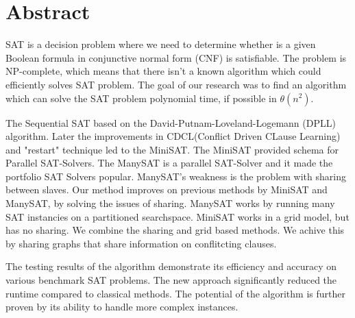 \documentclass{article}
\begin{document}
\section{Abstract}
SAT is a decision problem where we need to determine whether is a given Boolean formula in conjunctive normal form (CNF) is satisfiable. The problem is NP-complete, which means that there isn’t a known algorithm which could efficiently solves SAT problem.
The goal of our research was to find an algorithm which can solve the SAT problem polynomial time, if possible in $\theta(n^2)$.

The Sequential SAT based on the David-Putnam-Loveland-Logemann (DPLL) algorithm. Later the improvements in CDCL(Conflict Driven CLause Learning) and "restart" technique led to the MiniSAT. The MiniSAT provided schema for Parallel SAT-Solvers. The ManySAT is a parallel SAT-Solver and it made the portfolio SAT Solvers popular. ManySAT's weakness is the problem with sharing between slaves. Our method improves on previous methods by MiniSAT and ManySAT, by solving the issues of sharing. ManySAT works by running many SAT instancies on a partitioned searchspace. MiniSAT works in a grid model, but has no sharing. We combine the sharing and grid based methods. We achive this by sharing graphs that share information on conflitcting clauses.

The testing results of the algorithm demonstrate its efficiency and accuracy on various benchmark SAT problems. The new approach significantly reduced the runtime compared to classical methods. The potential of the algorithm is further proven by its ability to handle more complex instances.
\end{document}
